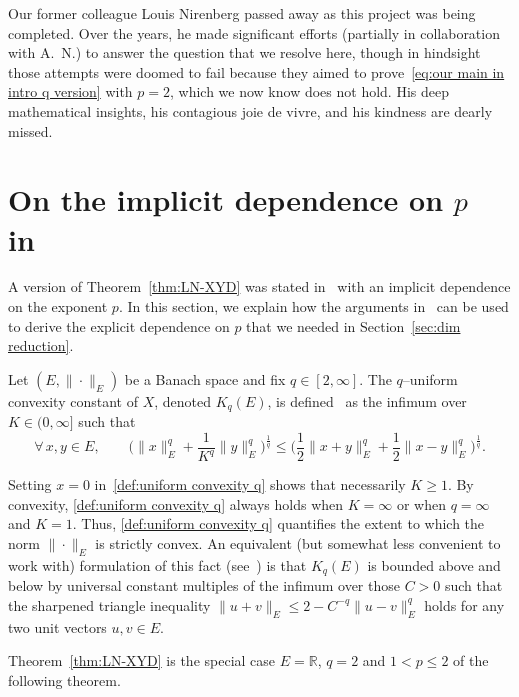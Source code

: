 \documentclass[11pt,reqno]{amsart}
\newcommand{\R}{\mathbb{R}}
\newcommand{\0}{\mathbf{0}}
\renewcommand{\1}{\mathbf 1}
\renewcommand{\ge}{\geqslant}
\renewcommand{\le}{\leqslant}
\theoremstyle{remark}
\begin{document}
Our former colleague Louis Nirenberg passed away as this project was being completed. Over the years, he made significant efforts (partially in collaboration with A.~N.) to answer the question that we resolve here, though in hindsight those attempts were doomed to fail because they aimed to prove~\eqref{eq:our main in intro q version} with $p=2$, which we now know does not hold. His deep mathematical insights,  his contagious joie de vivre, and his kindness are dearly missed.








\appendix
\section{On the implicit dependence on $p$  in~\cite{LafforgueNaor}}\label{sec:littlewood paley}

A version of Theorem~\ref{thm:LN-XYD} was stated in~\cite{LafforgueNaor} with an implicit dependence on the exponent $p$.  In this section, we explain how the arguments in~\cite{LafforgueNaor} can be used to derive the explicit dependence on $p$ that we needed in Section~\ref{sec:dim reduction}.

Let $(E,\|\cdot\|_E)$ be a Banach space and fix $q\in [2,\infty]$. The $q$--uniform convexity constant of $X$, denoted $K_q(E)$, is defined~\cite{Bal92,BCL94} as the infimum over $K\in (0,\infty]$ such that
\begin{equation}\label{def:uniform convexity q}
\forall\, x,y\in E,\qquad \Big(\|x\|_E^q+\frac{1}{K^q}\|y\|_E^q\Big)^{\frac{1}{q}}\le \bigg(\frac12 \|x+y\|_E^q+\frac12\|x-y\|_E^q\bigg)^{\frac{1}{q}}.
\end{equation}

Setting $x=0$ in~\eqref{def:uniform convexity q} shows that necessarily $K\ge 1$. By convexity, \eqref{def:uniform convexity q} always holds  when $K=\infty$ or when $q=\infty$ and $K=1$. Thus, \eqref{def:uniform convexity q} quantifies the extent to which the norm $\|\cdot\|_E$ is strictly convex. An equivalent (but somewhat less convenient to work with) formulation of this fact (see~\cite{Fig76,BCL94}) is that $K_q(E)$ is bounded above and below by universal constant multiples of the infimum over those $C>0$ such that the sharpened triangle inequality $\|u+v\|_E\le 2-C^{-q}\|u-v\|_E^q$ holds for any two unit vectors $u,v\in E$.

Theorem~\ref{thm:LN-XYD} is the special case $E=\R$, $q=2$ and $1<p\le 2$ of the following theorem.
\end{document}
